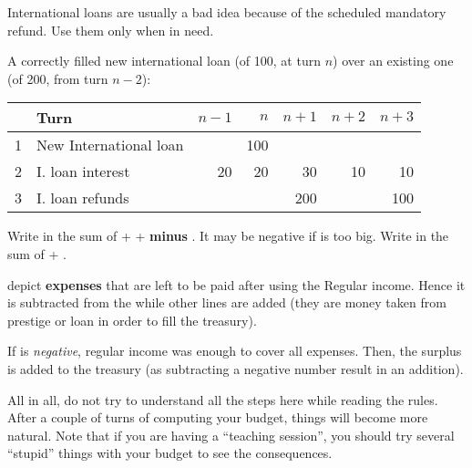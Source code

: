 \begin{playtip}
  International loans are usually a bad idea because of the scheduled
  mandatory refund. Use them only when in need.
\end{playtip}

\begin{exemple}
  A correctly filled new international loan (of 100\ducats, at turn $n$) over
  an existing one (of 200\ducats, from turn $n-2$):
  \begin{tabular}{|c|l|r|r|r|r|r|}
    \hline
    & Turn & $n-1$ & $n$ & $n+1$ & $n+2$ & $n+3$\\
    \hline
    1 & New International loan & & 100 & & &\\
    \hline
    2 & I. loan interest & 20 & 20 & 30 & 10 & 10\\
    \hline
    3 & I. loan refunds & & & 200 & & 100\\
    \hline
  \end{tabular}
\end{exemple}

\aparag[New \RT]
\bparag Write in  the sum of  +  + 
\textbf{minus} . It may be negative if
 is too big.
\bparag Write in  the sum of
 + .

\begin{designnote}
   depict \textbf{expenses} that are left
  to be paid after using the Regular income. Hence it is subtracted from the
  \RT while other lines are added (they are money taken from prestige or loan
  in order to fill the treasury).

  If  is \emph{negative}, regular income was
  enough to cover all expenses. Then, the surplus is added to the treasury (as
  subtracting a negative number result in an addition).
\end{designnote}

\begin{designnote}
  All in all, do not try to understand all the steps here while reading the
  rules. After a couple of turns of computing your budget, things will become
  more natural. Note that if you are having a ``teaching session'', you should
  try several ``stupid'' things with your budget to see the consequences.
\end{designnote}

